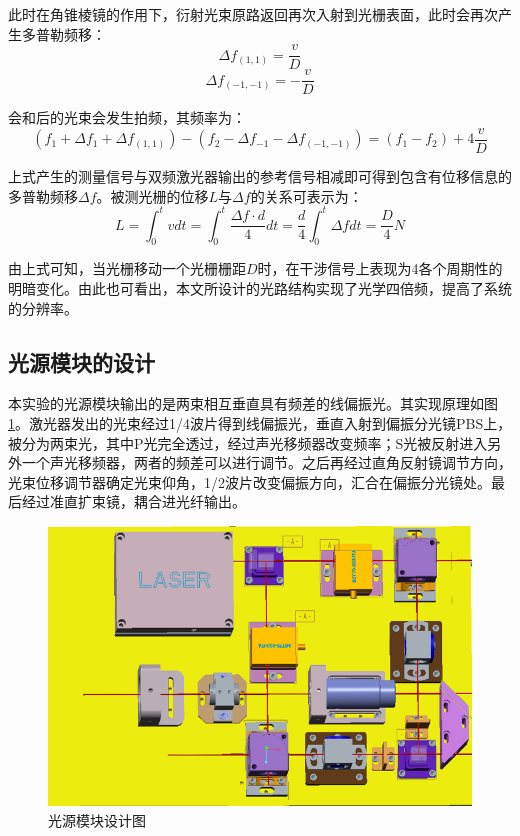 \documentclass[type=master,oneside]{fduthesis}
\begin{document}
此时在角锥棱镜的作用下，衍射光束原路返回再次入射到光栅表面，此时会再次产生多普勒频移：
\begin{equation}
  \Delta f_{(1,1)}=\frac{v}{D}
\end{equation}
\begin{equation}
  \Delta f_{(-1,-1)}=-\frac{v}{D}
\end{equation}

会和后的光束会发生拍频，其频率为：
\begin{equation}
  \left(f_{1} + \Delta f_{1}+\Delta f_{(1,1)}\right)-\left(f_{2} - \Delta f_{-1}-\Delta f_{(-1,-1)}\right)=\left(f_{1}-f_{2}\right) + 4 \frac{v}{D}
\end{equation}

上式产生的测量信号与双频激光器输出的参考信号相减即可得到包含有位移信息的多普勒频移$\Delta f$。被测光栅的位移$L$与$\Delta f$的关系可表示为：
\begin{equation}
  L=\int_{0}^{t}v d t=\int_{0}^{t} \frac{\Delta f \cdot d}{4} d t=\frac{d}{4} \int_{0}^{t} \Delta f d t=\frac{D}{4}N
\end{equation}

由上式可知，当光栅移动一个光栅栅距$D$时，在干涉信号上表现为4各个周期性的明暗变化。由此也可看出，本文所设计的光路结构实现了光学四倍频，提高了系统的分辨率。

\subsection{光源模块的设计}
本实验的光源模块输出的是两束相互垂直具有频差的线偏振光。其实现原理如图\ref{fig:光源模块设计图}。激光器发出的光束经过1/4波片得到线偏振光，垂直入射到偏振分光镜PBS上，被分为两束光，其中P光完全透过，经过声光移频器改变频率；S光被反射进入另外一个声光移频器，两者的频差可以进行调节。之后再经过直角反射镜调节方向，光束位移调节器确定光束仰角，1/2波片改变偏振方向，汇合在偏振分光镜处。最后经过准直扩束镜，耦合进光纤输出。
\begin{figure}[H]
  \centering
  \includegraphics[width=1\textwidth]{3-fig//光源模块设计图.png}
  \caption{光源模块设计图}
  \label{fig:光源模块设计图}
\end{figure}
\end{document}
